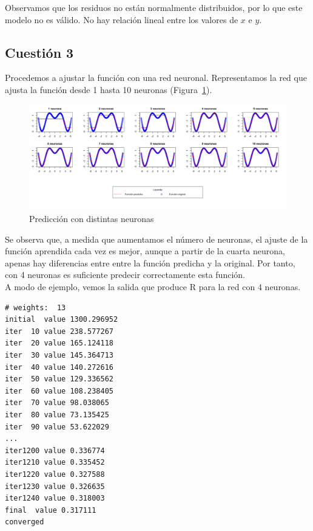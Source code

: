 \documentclass[12pt,a4paper,twoside,openright,titlepage,final]{article}
\begin{document}
Observamos que los residuos no están normalmente distribuidos, por lo que este modelo no es válido. No hay relación lineal entre los valores de $x$ e $y$.

\subsection{Cuestión 3}

Procedemos a ajustar la función con una red neuronal. Representamos la red que ajusta la función desde 1 hasta 10 neuronas (Figura~\ref{fig:diferentes_neuronas}).\\

\begin{figure}[tbph!]
\centering
\includegraphics[width=1\linewidth]{imagenes/diferentes_neuronas}
\caption{Predicción con distintas neuronas}
\label{fig:diferentes_neuronas}
\end{figure}

Se observa que, a medida que aumentamos el número de neuronas, el ajuste de la función aprendida cada vez es mejor, aunque a partir de la cuarta neurona, apenas hay diferencias entre entre la función predicha y la original. Por tanto, con 4 neuronas es suficiente predecir correctamente esta función.\\

A modo de ejemplo, vemos la salida que produce R para la red con 4 neuronas.

\begin{verbatim}
# weights:  13
initial  value 1300.296952 
iter  10 value 238.577267
iter  20 value 165.124118
iter  30 value 145.364713
iter  40 value 140.272616
iter  50 value 129.336562
iter  60 value 108.238405
iter  70 value 98.038065
iter  80 value 73.135425
iter  90 value 53.622029
...
iter1200 value 0.336774
iter1210 value 0.335452
iter1220 value 0.327588
iter1230 value 0.326635
iter1240 value 0.318003
final  value 0.317111 
converged
\end{verbatim}
\end{document}
